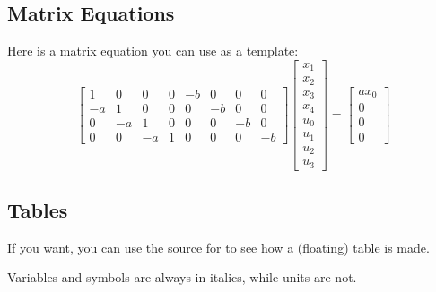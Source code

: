 \subsection{Matrix Equations}
Here is a matrix equation you can use as a template:
\begin{equation}
	\begin{bmatrix}
		1 &  0 &  0 & 0 & -b &  0 &  0 &  0 \\
		-a &  1 &  0 & 0 &  0 & -b &  0 &  0 \\
		0 & -a &  1 & 0 &  0 &  0 & -b &  0 \\
		0 &  0 & -a & 1 &  0 &  0 &  0 & -b                                
	\end{bmatrix}
	\begin{bmatrix} x_1 \\ x_2 \\ x_3 \\ x_4 \\ u_0 \\ u_1 \\ u_2 \\ u_3 \end{bmatrix}
	=
	\begin{bmatrix}
		ax_0 \\ 0 \\ 0 \\ 0      
	\end{bmatrix}
\end{equation}

\subsection{Tables}
If you want, you can use the source for  to see how a (floating) table is made. 

Variables and symbols are always in italics, while units are not.

